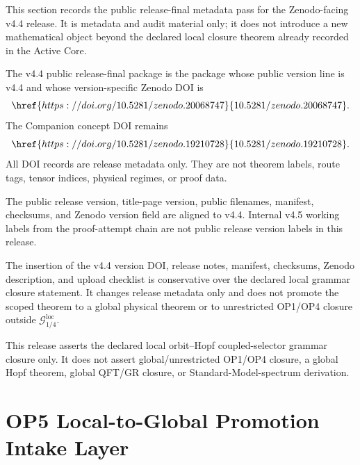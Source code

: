 This section records the public release-final metadata pass for the Zenodo-facing v4.4 release.  It is metadata and audit material only; it does not introduce a new mathematical object beyond the declared local closure theorem already recorded in the Active Core.

\begin{definition}
The v4.4 public release-final package is the package whose public version line is v4.4 and whose version-specific Zenodo DOI is
\[
    \href{https://doi.org/10.5281/zenodo.20068747}{10.5281/zenodo.20068747}.
\]
The Companion concept DOI remains
\[
    \href{https://doi.org/10.5281/zenodo.19210728}{10.5281/zenodo.19210728}.
\]
All DOI records are release metadata only.  They are not theorem labels, route tags, tensor indices, physical regimes, or proof data.
\end{definition}

\begin{proposition}
The public release version, title-page version, public filenames, manifest, checksums, and Zenodo version field are aligned to v4.4.  Internal v4.5 working labels from the proof-attempt chain are not public release version labels in this release.
\end{proposition}

\begin{theorem}
The insertion of the v4.4 version DOI, release notes, manifest, checksums, Zenodo description, and upload checklist is conservative over the declared local grammar closure statement.  It changes release metadata only and does not promote the scoped theorem to a global physical theorem or to unrestricted OP1/OP4 closure outside \(\mathcal G_{1/4}^{\mathrm{loc}}\).
\end{theorem}

\begin{remark}
This release asserts the declared local orbit--Hopf coupled-selector grammar closure only.  It does not assert global/unrestricted OP1/OP4 closure, a global Hopf theorem, global QFT/GR closure, or Standard-Model-spectrum derivation.
\end{remark}



\section{OP5 Local-to-Global Promotion Intake Layer}
\label{sec:v450-r01-op5-local-to-global-promotion-intake}

